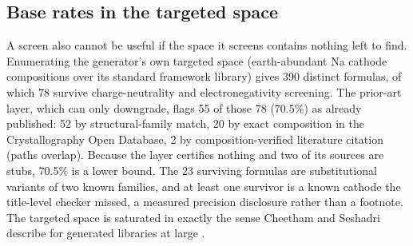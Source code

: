 \documentclass[reprint,aps,prb,amsmath,amssymb,nofootinbib,longbibliography]{revtex4-2}
\begin{document}
\subsection{Base rates in the targeted space}
\label{sec:resultsB3}

A screen also cannot be useful if the space it screens contains nothing left
to find. Enumerating the generator's own targeted space (earth-abundant
Na cathode compositions over its standard framework library) gives 390
distinct formulas, of which 78 survive charge-neutrality and
electronegativity screening. The prior-art layer, which can only downgrade,
flags 55 of those 78 (70.5\%) as already published: 52 by structural-family
match, 20 by exact composition in the Crystallography Open Database, 2 by
composition-verified literature citation (paths overlap). Because the layer
certifies nothing and two of its sources are stubs, 70.5\% is a lower bound.
The 23 surviving formulas are substitutional variants of two known families,
and at least one survivor is a known cathode the title-level checker missed,
a measured precision disclosure rather than a footnote. The targeted space is
saturated in exactly the sense Cheetham and Seshadri describe for generated
libraries at large \cite{cheetham2024}.

\begin{table}[tb]
\caption{\label{tab:baserate}Prior-art base-rate probes. Top: the
generator's targeted earth-abundant Na space. Bottom: a pinned uniform
sample of the GNoME stable-materials release screened with the same layer,
and the staged triage funnel applied to the prior-art-absent remainder.
Flagged rates are lower bounds (the layer only downgrades); the GNoME
verified floor reflects a hand audit of the five flagged hits (3/5
confirmed). The stability disputes are a disagreement rate between two
models, not a correctness measure.}

\end{table}
\end{document}
